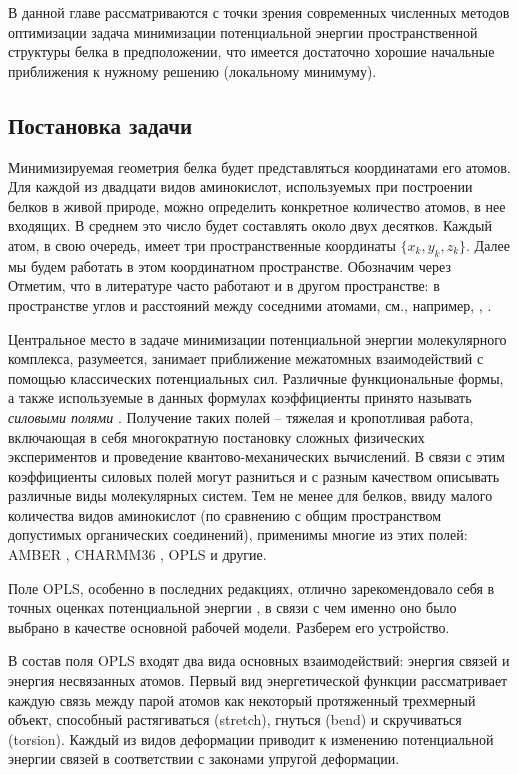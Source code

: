   В данной главе рассматриваются с точки зрения современных численных методов оптимизации задача минимизации потенциальной энергии пространственной структуры белка в предположении, что имеется достаточно хорошие начальные приближения к нужному решению (локальному минимуму).

  \subsection{Постановка задачи} \label{subsec:sec1/su2}

  Минимизируемая геометрия белка будет представляться координатами его атомов.
  Для каждой из двадцати видов аминокислот, используемых при построении белков в живой природе, можно определить конкретное количество атомов, в нее входящих.
  В среднем это число будет составлять около двух десятков.
  Каждый атом, в свою очередь, имеет три пространственные координаты $\{x_k ,y_k ,z_k\}$.
  Далее мы будем работать в этом координатном пространстве.
  Обозначим через 
  Отметим, что в литературе часто работают и в другом пространстве: в пространстве углов и расстояний между соседними атомами, см., например, \cite{canutescu2003cyclic}, \cite{coutsias2004kinematic}. 

  Центральное место в задаче минимизации потенциальной энергии молекулярного комплекса, разумеется, занимает приближение межатомных взаимодействий с помощью классических потенциальных сил.
  Различные функциональные формы, а также используемые в данных формулах коэффициенты принято называть \textit{силовыми полями} \cite{Ponder2003}.
  Получение таких полей -- тяжелая и кропотливая работа, включающая в себя многократную постановку сложных физических экспериментов и проведение квантово-механических вычислений.
  В связи с этим коэффициенты силовых полей могут разниться и с разным качеством описывать различные виды молекулярных систем.
  Тем не менее для белков, ввиду малого количества видов аминокислот (по сравнению с общим пространством допустимых органических соединений), применимы многие из этих полей: AMBER \cite{Cornell1995}, CHARMM36 \cite{Huang2017}, OPLS \cite{Jorgensen1996} и другие.

  Поле OPLS, особенно в последних редакциях, отлично зарекомендовало себя в точных оценках потенциальной энергии \cite{Sweere2017}, в связи с чем именно оно было
  выбрано в качестве основной рабочей модели.
  Разберем его устройство.

  В состав поля OPLS входят два вида основных взаимодействий: энергия связей и энергия несвязанных атомов.
  Первый вид энергетической функции рассматривает каждую связь между парой атомов как некоторый протяженный трехмерный объект, способный растягиваться (stretch), гнуться (bend) и скручиваться (torsion).
  Каждый из видов деформации приводит к изменению потенциальной энергии связей в соответствии с законами упругой деформации.

